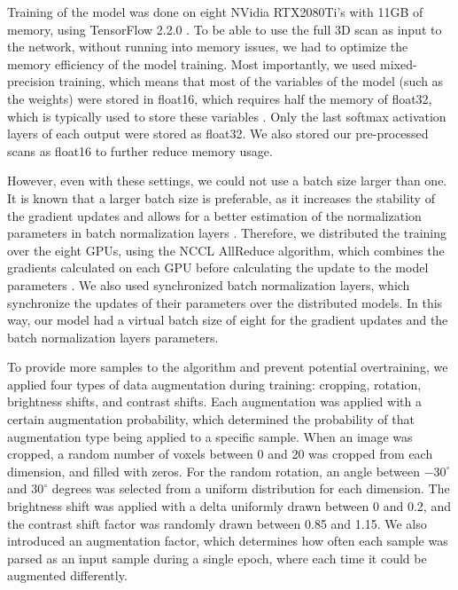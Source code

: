 Training of the model was done on eight NVidia RTX2080Ti's with 11GB of memory, using TensorFlow 2.2.0 \autocite{tensorflow2015whitepaper}.
To be able to use the full 3D scan as input to the network, without running into memory issues, we had to optimize the memory efficiency of the model training.
Most importantly, we used mixed-precision training, which means that most of the variables of the model (such as the weights) were stored in float16, which requires half the memory of float32, which is typically used to store these variables \autocite{das2018mixed}.
Only the last softmax activation layers of each output were stored as float32.
We also stored our pre-processed scans as float16 to further reduce memory usage.

However, even with these settings, we could not use a batch size larger than one.
It is known that a larger batch size is preferable, as it increases the stability of the gradient updates and allows for a better estimation of the normalization parameters in batch normalization layers \autocite{smith2018batch}.
Therefore, we distributed the training over the eight GPUs, using the NCCL AllReduce algorithm, which combines the gradients calculated on each GPU before calculating the update to the model parameters \autocite{woolleynccl}.
We also used synchronized batch normalization layers, which synchronize the updates of their parameters over the distributed models.
In this way, our model had a virtual batch size of eight for the gradient updates and the batch normalization layers parameters.

To provide more samples to the algorithm and prevent potential overtraining, we applied four types of data augmentation during training: cropping, rotation, brightness shifts, and contrast shifts.
Each augmentation was applied with a certain augmentation probability, which determined the probability of that augmentation type being applied to a specific sample.
When an image was cropped, a random number of voxels between 0 and 20 was cropped from each dimension, and filled with zeros.
For the random rotation, an angle between $-30^{\circ}$ and $30^{\circ}$ degrees was selected from a uniform distribution for each dimension.
The brightness shift was applied with a delta uniformly drawn between \num{0} and \num{0.2}, and the contrast shift factor was randomly drawn between \num{0.85} and \num{1.15}.
We also introduced an augmentation factor, which determines how often each sample was parsed as an input sample during a single epoch, where each time it could be augmented differently.

